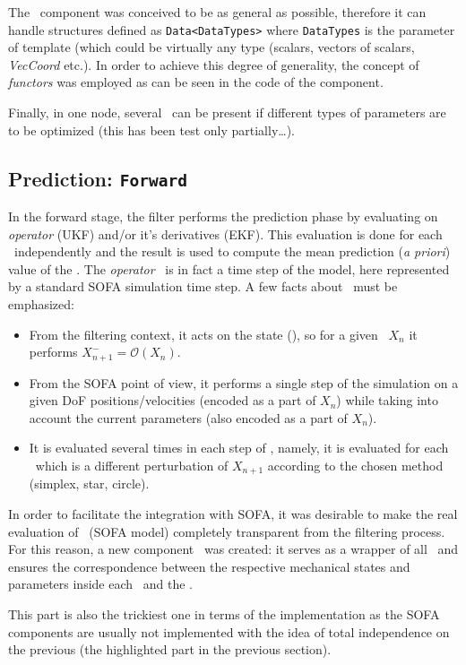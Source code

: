 \documentclass[10pt]{article}
\begin{document}
The \opr\ component was conceived to be as general as possible, therefore it can handle structures defined as \texttt{Data<DataTypes>} where
\texttt{DataTypes} is the parameter of template (which could be virtually any type (scalars, vectors of scalars, \emph{VecCoord} etc.). In order to
achieve this degree of generality, the concept of \emph{functors} was employed as can be seen in the code of the component. 

Finally, in one node, several  \opr\ can be present if different types of parameters are to be optimized (this has been test only partially\ldots).

\subsection{Prediction: \texttt{Forward}}
In the forward stage, the filter performs the prediction phase by evaluating on \emph{operator} (UKF) and/or it's derivatives (EKF). This evaluation
is done for each \smp\ independently and the 
result is used to compute the mean prediction (\emph{a priori}) value of the \sstate. The \emph{operator} \op\ is in fact a time step of the model,
here represented by a standard SOFA simulation time step.
A few facts about \op\ must be emphasized:
\begin{itemize}
\item From the filtering context, it acts on the state (\sstate), so for a given \sstate\ $X_n$ it performs $X^-_{n+1} =
\mathcal{O}(X_{n})$.  
\item From the SOFA point of view, it performs a single step of the simulation on a given DoF positions/velocities (encoded as a part of $X_n$)  while
taking into account the current parameters (also encoded as a part of $X_n$).
\item It is evaluated several times in each step of \ssda, namely, it is evaluated for each \smp\ which is a different perturbation of $X_{n+1}$
according to the chosen method (simplex, star, circle). 
\end{itemize}

In order to facilitate the integration with SOFA, it was desirable to make the real evaluation of \op\ (SOFA model) completely transparent
from the filtering process. 
For this reason, a new component \smw\  was created: it serves as a wrapper of all \asns\ and ensures the correspondence between the respective
mechanical states and parameters 
inside each \asn\ and the \sstate.

This part is also the trickiest one in terms of the implementation as the SOFA components are usually not implemented with the idea of total independence on the previous (the highlighted part in the previous section).
\end{document}
